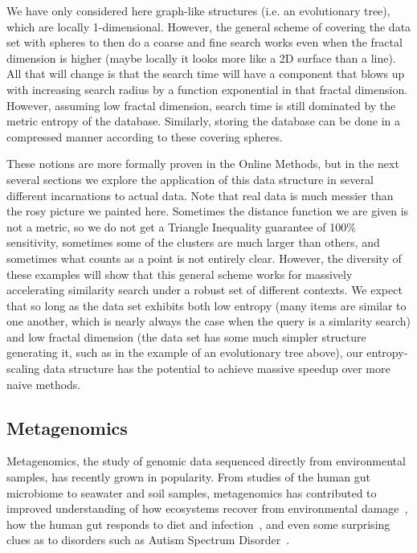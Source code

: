 \documentclass[review,preprint,12pt]{elsarticle}
\renewcommand{\cite}{\citep} %
\theoremstyle{definition}
\theoremstyle{remark}
\numberwithin{equation}{section}
\begin{document}
We have only considered here graph-like structures (i.e. an evolutionary tree), which are locally 1-dimensional.
However, the general scheme of covering the data set with spheres to then do a coarse and fine search works even when the fractal dimension is higher (maybe locally it looks more like a 2D surface than a line).
All that will change is that the search time will have a component that blows up with increasing search radius by a function exponential in that fractal dimension.
However, assuming low fractal dimension, search time is still dominated by the metric entropy of the database.
Similarly, storing the database can be done in a compressed manner according to these covering spheres.

These notions are more formally proven in the Online Methods, but in the next several sections we explore the application of this data structure in several different incarnations to actual data.
Note that real data is much messier than the rosy picture we painted here.
Sometimes the distance function we are given is not a metric, so we do not get a Triangle Inequality guarantee of 100\% sensitivity,
sometimes some of the clusters are much larger than others, and sometimes what counts as a point is not entirely clear.
However, the diversity of these examples will show that this general scheme works for massively accelerating similarity search under a robust set of different contexts.
We expect that so long as the data set exhibits both low entropy (many items are similar to one another, which is nearly always the case when the query is a simlarity search) and low fractal dimension (the data set has some much simpler structure generating it, such as in the example of an evolutionary tree above), our entropy-scaling data structure has the potential to achieve massive speedup over more naive methods.

\subsection{Metagenomics}

Metagenomics, the study of genomic data sequenced directly from environmental
samples, has recently grown in popularity.
From studies of the human gut microbiome to seawater and soil samples,
metagenomics has contributed to improved understanding of how ecosystems recover
from environmental damage~\cite{tyson2004community}, how the human gut responds 
to diet
and infection~\cite{david2014host}, and even some surprising clues as to disorders 
such as Autism Spectrum Disorder~\cite{macfabe2012short}.
\end{document}
